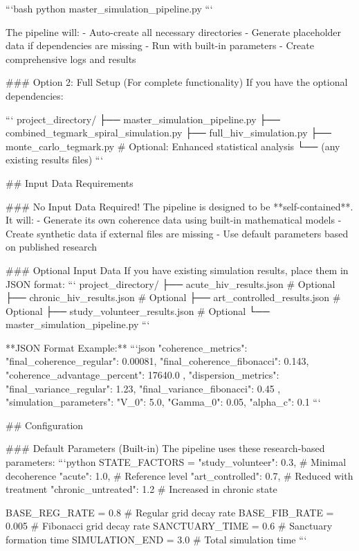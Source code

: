 ```bash
python master_simulation_pipeline.py
```

The pipeline will:
- Auto-create all necessary directories
- Generate placeholder data if dependencies are missing
- Run with built-in parameters
- Create comprehensive logs and results

### Option 2: Full Setup (For complete functionality)
If you have the optional dependencies:

```
project_directory/
├── master_simulation_pipeline.py
├── combined_tegmark_spiral_simulation.py
├── full_hiv_simulation.py
├── monte_carlo_tegmark.py               # Optional: Enhanced statistical analysis
└── (any existing results files)
```

## Input Data Requirements

### No Input Data Required!
The pipeline is designed to be **self-contained**. It will:
- Generate its own coherence data using built-in mathematical models
- Create synthetic data if external files are missing
- Use default parameters based on published research

### Optional Input Data
If you have existing simulation results, place them in JSON format:
```
project_directory/
├── acute_hiv_results.json               # Optional
├── chronic_hiv_results.json             # Optional  
├── art_controlled_results.json          # Optional
├── study_volunteer_results.json         # Optional
└── master_simulation_pipeline.py
```

**JSON Format Example:**
```json
{
  "coherence_metrics": {
    "final_coherence_regular": 0.00081,
    "final_coherence_fibonacci": 0.143,
    "coherence_advantage_percent": 17640.0
  },
  "dispersion_metrics": {
    "final_variance_regular": 1.23,
    "final_variance_fibonacci": 0.45
  },
  "simulation_parameters": {
    "V_0": 5.0,
    "Gamma_0": 0.05,
    "alpha_c": 0.1
  }
}
```

## Configuration

### Default Parameters (Built-in)
The pipeline uses these research-based parameters:
```python
STATE_FACTORS = {
    "study_volunteer": 0.3,    # Minimal decoherence
    "acute": 1.0,             # Reference level
    "art_controlled": 0.7,    # Reduced with treatment  
    "chronic_untreated": 1.2  # Increased in chronic state
}

BASE_REG_RATE = 0.8          # Regular grid decay rate
BASE_FIB_RATE = 0.005        # Fibonacci grid decay rate
SANCTUARY_TIME = 0.6         # Sanctuary formation time
SIMULATION_END = 3.0         # Total simulation time
```

